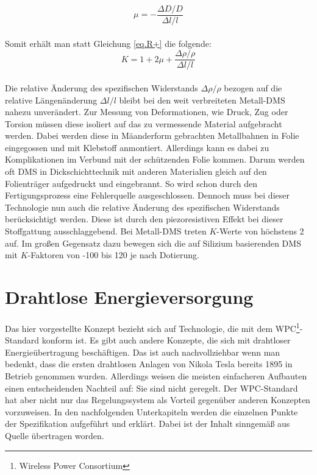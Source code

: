 \documentclass[12pt]{scrreprt} %
\begin{document}
\begin{equation}
\mu=-\frac{\Delta D / D}{\Delta l / l}
\end{equation}\\
Somit erhält man statt Gleichung \vref{eq.R+} die folgende:\\
\begin{equation}
K=1+2\mu+\frac{\displaystyle\Delta \rho / \rho}{\displaystyle\Delta l / l}
\end{equation}\\
Die relative Änderung des spezifischen Widerstands $\Delta \rho/ \rho$ bezogen auf die relative Längenänderung $\Delta l/ l$ bleibt bei den weit verbreiteten Metall-DMS nahezu unverändert. Zur Messung von Deformationen, wie Druck, Zug oder Torsion müssen diese isoliert auf das zu vermessende Material aufgebracht werden. Dabei werden diese in Mäanderform gebrachten Metallbahnen in Folie eingegossen und mit Klebstoff anmontiert. Allerdings kann es dabei zu Komplikationen im Verbund mit der schützenden Folie kommen. Darum werden oft DMS in Dickschichttechnik mit anderen Materialien gleich auf den Folienträger aufgedruckt und eingebrannt. So wird schon durch den Fertigungsprozess eine Fehlerquelle ausgeschlossen. Dennoch muss bei dieser Technologie nun auch die relative Änderung des spezifischen Widerstands berücksichtigt werden. Diese ist durch den piezoresistiven Effekt bei dieser Stoffgattung ausschlaggebend. Bei Metall-DMS treten $K$-Werte von höchstens 2 auf. Im großen Gegensatz dazu bewegen sich die auf Silizium basierenden DMS mit $K$-Faktoren von -100 bis 120 je nach Dotierung. 
\section{Drahtlose Energieversorgung}
Das hier vorgestellte Konzept bezieht sich auf Technologie, die mit dem WPC\footnote{Wireless Power Consortium}-Standard konform ist. Es gibt auch andere Konzepte, die sich mit drahtloser Energieübertragung beschäftigen. Das ist auch nachvollziehbar wenn man bedenkt, dass die ersten drahtlosen Anlagen von Nikola Tesla bereits 1895 in Betrieb genommen wurden\citep{TESLA}. Allerdings weisen die meisten einfacheren Aufbauten einen entscheidenden Nachteil auf: Sie sind nicht geregelt. Der WPC-Standard hat aber nicht nur das Regelungssystem als Vorteil gegenüber anderen Konzepten vorzuweisen. In den nachfolgenden Unterkapiteln werden die einzelnen Punkte der Spezifikation aufgeführt und erklärt. Dabei ist der Inhalt sinngemäß aus Quelle \citep{WPC} übertragen worden.
\end{document}
